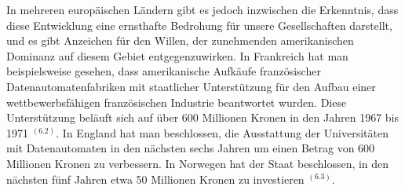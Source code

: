 {In mehreren europäischen Ländern gibt es jedoch inzwischen die Erkenntnis, dass diese Entwicklung eine ernsthafte Bedrohung für unsere Gesellschaften darstellt, und es gibt Anzeichen für den Willen, der zunehmenden amerikanischen Dominanz auf diesem Gebiet entgegenzuwirken. In Frankreich hat man beispielsweise gesehen, dass amerikanische Aufkäufe französischer Datenautomatenfabriken mit staatlicher Unterstützung für den Aufbau einer wettbewerbsfähigen französischen Industrie beantwortet wurden. Diese Unterstützung beläuft sich auf über 600 Millionen Kronen in den Jahren 1967 bis 1971 $^{(6.2)}$. In England hat man beschlossen, die Ausstattung der Universitäten mit Datenautomaten in den nächsten sechs Jahren um einen Betrag von 600 Millionen Kronen zu verbessern. In Norwegen hat der Staat beschlossen, in den nächsten fünf Jahren etwa 50 Millionen Kronen zu investieren $^{(6.3)}$.
}


